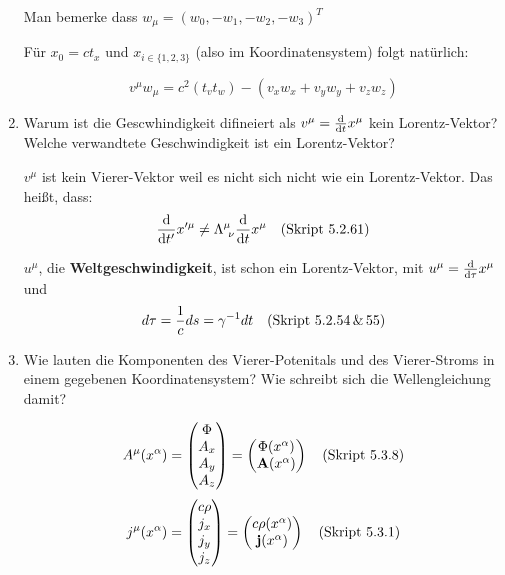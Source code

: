 \begin{enumerate}
    Man bemerke dass $w_\mu=(w_0, -w_1, -w_2, -w_3)^T$

    Für $x_0=ct_x$ und $x_{i\in\{1,2,3\}}$ (also im Koordinatensystem) 
    folgt natürlich:

    \begin{equation*}
      v^\mu w_\mu = c^2(t_vt_w) - (v_xw_x + v_yw_y + v_zw_z)
    \end{equation*}

  \item Warum ist die Gescwhindigkeit difineiert als $v^\mu=\dv t x^\mu$
    kein Lorentz-Vektor? Welche verwandtete Geschwindigkeit ist ein
    Lorentz-Vektor?

    $v^\mu$ ist kein Vierer-Vektor weil es nicht sich nicht
    wie ein Lorentz-Vektor. Das heißt, dass:
    \begin{equation*}
      \dv {t'} x'^\mu \neq \Lambda^{\mu}_{\ \nu}\dv t x^\mu
      \quad\text{(Skript 5.2.61)}
    \end{equation*}

    $u^\mu$, die \textbf{Weltgeschwindigkeit}, 
    ist schon ein Lorentz-Vektor,
    mit $u^\mu=\dv \tau x^\mu$ und
    $$d\tau=\frac{1}{c}ds=\gamma^{-1}dt \quad\text{(Skript 5.2.54\,\&\,55)}$$

  \clearpage
  \item Wie lauten die Komponenten des Vierer-Potenitals und des
    Vierer-Stroms in einem gegebenen Koordinatensystem? Wie schreibt
    sich die Wellengleichung damit?

    \begin{equation*}
      A^\mu(x^\alpha)=
      \begin{pmatrix}
        \Phi\\ A_x\\ A_y\\ A_z
      \end{pmatrix}
      =
      \begin{pmatrix}
        \Phi(x^\alpha) \\ \vb A(x^\alpha)
      \end{pmatrix}
      \quad\text{(Skript 5.3.8)}
    \end{equation*}
    \begin{equation*}
      j^\mu(x^\alpha) =
      \begin{pmatrix}
        c\rho\\ j_x\\ j_y\\ j_z
      \end{pmatrix}
      =
      \begin{pmatrix}
        c\rho(x^\alpha) \\ \vb j(x^\alpha)
      \end{pmatrix}
      \quad\text{(Skript 5.3.1)}
    \end{equation*}


\end{enumerate}
